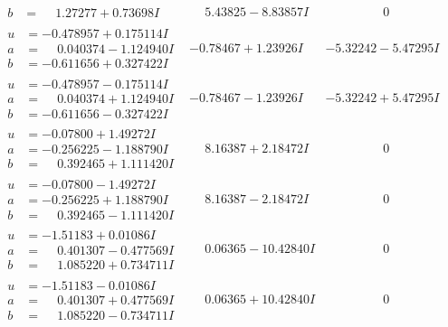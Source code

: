 \documentclass[1p]{elsarticle_modified}
\theoremstyle{definition}
\begin{document}
$$\begin{array}{c|c|c}
\begin{aligned}
b &= \phantom{-}1.27277 + 0.73698 I\end{aligned}
 & \phantom{-}5.43825 - 8.83857 I & \phantom{-0.000000 } 0 \\ \hline\begin{aligned}
u &= -0.478957 + 0.175114 I \\
a &= \phantom{-}0.040374 - 1.124940 I \\
b &= -0.611656 + 0.327422 I\end{aligned}
 & -0.78467 + 1.23926 I & -5.32242 - 5.47295 I \\ \hline\begin{aligned}
u &= -0.478957 - 0.175114 I \\
a &= \phantom{-}0.040374 + 1.124940 I \\
b &= -0.611656 - 0.327422 I\end{aligned}
 & -0.78467 - 1.23926 I & -5.32242 + 5.47295 I \\ \hline\begin{aligned}
u &= -0.07800 + 1.49272 I \\
a &= -0.256225 - 1.188790 I \\
b &= \phantom{-}0.392465 + 1.111420 I\end{aligned}
 & \phantom{-}8.16387 + 2.18472 I & \phantom{-0.000000 } 0 \\ \hline\begin{aligned}
u &= -0.07800 - 1.49272 I \\
a &= -0.256225 + 1.188790 I \\
b &= \phantom{-}0.392465 - 1.111420 I\end{aligned}
 & \phantom{-}8.16387 - 2.18472 I & \phantom{-0.000000 } 0 \\ \hline\begin{aligned}
u &= -1.51183 + 0.01086 I \\
a &= \phantom{-}0.401307 - 0.477569 I \\
b &= \phantom{-}1.085220 + 0.734711 I\end{aligned}
 & \phantom{-}0.06365 - 10.42840 I & \phantom{-0.000000 } 0 \\ \hline\begin{aligned}
u &= -1.51183 - 0.01086 I \\
a &= \phantom{-}0.401307 + 0.477569 I \\
b &= \phantom{-}1.085220 - 0.734711 I\end{aligned}
 & \phantom{-}0.06365 + 10.42840 I & \phantom{-0.000000 } 0 \\ \hline\begin{aligned}

\end{aligned}
\end{array}$$
\end{document}
